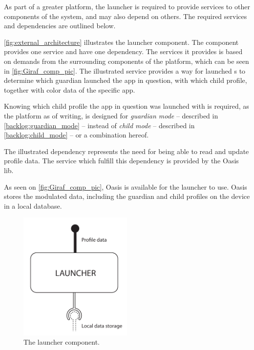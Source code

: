 \label{sec:design_overview}
As part of a greater platform, the launcher is required to provide services to other components of the \giraf[] system, and may also depend on others.
The required services and dependencies are outlined below.

\autoref{fig:external_architecture} illustrates the \giraf[] launcher component. The component provides one service and have one dependency.
The services it provides is based on demands from the surrounding components of the \giraf[] platform, which can be seen in \autoref{fig:Giraf_comp_pic}.
The illustrated service provides a way for launched \girafapp[]s to determine which guardian launched the app in question, with which child profile, together with color data of the specific app.

Knowing which child profile the app in question was launched with is required, as the \giraf[] platform as of writing, is designed for \emph{guardian mode} -- described in \autoref{backlog:guardian_mode} -- instead of \emph{child mode} -- described in \autoref{backlog:child_mode} -- or a combination hereof.

The illustrated dependency represents the need for being able to read and update profile data. The service which fulfill this dependency is provided by the Oasis lib. 

As seen on \autoref{fig:Giraf_comp_pic}, Oasis is available for the launcher to use. Oasis stores the modulated data, including the guardian and child profiles on the device in a local database.


\begin{figure}[h]
	\centering
	\includegraphics[width=0.5\textwidth]{gfx/external_launcher_architecture.pdf}
	\caption{The  \giraf[] launcher component.}
	\label{fig:external_architecture}
\end{figure}

